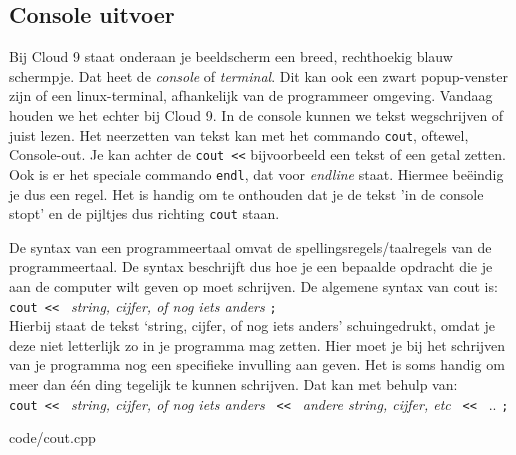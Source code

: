\documentclass[12pt,a4paper]{article}
\newcommand{\code}{}
\newcommand{\icode}{\lstinline}
\begin{document}
\subsection{Console uitvoer}
Bij Cloud 9 staat onderaan je beeldscherm een breed, rechthoekig blauw schermpje. Dat heet de \emph{console} of \emph{terminal}. Dit kan ook een zwart popup-venster zijn of een linux-terminal, afhankelijk van de programmeer omgeving. Vandaag houden we het echter bij Cloud 9. In de console kunnen we tekst wegschrijven of juist lezen. Het neerzetten van tekst kan met het commando \icode{cout}, oftewel, Console-out. Je kan achter de \icode{cout <<} bijvoorbeeld een tekst of een getal zetten. Ook is er het speciale commando \icode{endl}, dat voor \emph{endline} staat. Hiermee be\"eindig je dus een regel. Het is handig om te onthouden dat je de tekst 'in de console stopt' en de pijltjes dus richting \icode{cout} staan.

De syntax van een programmeertaal omvat de spellingsregels/taalregels van de programmeertaal. De syntax beschrijft dus hoe je een bepaalde opdracht die je aan de computer wilt geven op moet schrijven. De algemene syntax van cout is:\\

\icode{cout << } \emph{string, cijfer, of nog iets anders} \icode{;}\\

Hierbij staat de tekst `string, cijfer, of nog iets anders' schuingedrukt, omdat je deze niet letterlijk zo in je programma mag zetten. Hier moet je bij het schrijven van je programma nog een specifieke invulling aan geven. Het is soms handig om meer dan \'e\'en ding tegelijk te kunnen schrijven. Dat kan met behulp van:\\

\icode{cout << } \emph{string, cijfer, of nog iets anders} \icode{ << } \emph{andere string, cijfer, etc} \icode{ << } .. \icode{;}

\code{code/cout.cpp}
\end{document}
